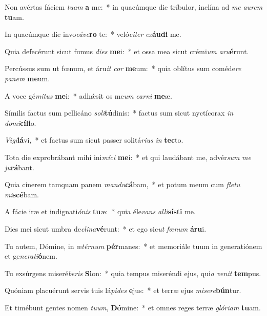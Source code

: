 \item Non avértas fáciem \textit{tu}\textit{am} \textbf{a} me:~* in quacúmque die tríbulor, inclína ad \textit{me} \textit{au}\textit{rem} \textbf{tu}am.
\item In quacúmque die invo\textit{cá}\textit{ve}\textbf{ro} te:~* veló\textit{ci}\textit{ter} \textit{ex}\textbf{áu}\textbf{di} me.
\item Quia defecérunt sicut fumus \textit{di}\textit{es} \textbf{me}i:~* et ossa mea sicut crémi\textit{um} \textit{a}\textit{ru}\textbf{é}runt.
\item Percússus sum ut fœnum, et áru\textit{it} \textit{cor} \textbf{me}um:~* quia oblítus sum coméde\textit{re} \textit{pa}\textit{nem} \textbf{me}um.
\item A voce gé\textit{mi}\textit{tus} \textbf{me}i:~* adhǽsit os me\textit{um} \textit{car}\textit{ni} \textbf{me}æ.
\item Símilis factus sum pellicáno \textit{so}\textit{li}\textbf{tú}dinis:~* factus sum sicut nyctícorax \textit{in} \textit{do}\textit{mi}\textbf{cí}\textbf{li}o.
\item \textit{Vi}\textit{gi}\textbf{lá}vi,~* et factus sum sicut passer solitá\textit{ri}\textit{us} \textit{in} \textbf{tec}to.
\item Tota die exprobrábant mihi ini\textit{mí}\textit{ci} \textbf{me}i:~* et qui laudábant me, advér\textit{sum} \textit{me} \textit{ju}\textbf{rá}bant.
\item Quia cínerem tamquam panem \textit{man}\textit{du}\textbf{cá}bam,~* et potum meum cum \textit{fle}\textit{tu} \textit{mi}\textbf{scé}bam.
\item A fácie iræ et indignati\textit{ó}\textit{nis} \textbf{tu}æ:~* quia éle\textit{vans} \textit{al}\textit{li}\textbf{sís}\textbf{ti} me.
\item Dies mei sicut umbra de\textit{cli}\textit{na}\textbf{vé}runt:~* et ego sic\textit{ut} \textit{fœ}\textit{num} \textbf{á}\textbf{ru}i.
\item Tu autem, Dómine, in æ\textit{tér}\textit{num} \textbf{pér}manes:~* et memoriále tuum in generatiónem et ge\textit{ne}\textit{ra}\textit{ti}\textbf{ó}nem.
\item Tu exsúrgens miseré\textit{be}\textit{ris} \textbf{Si}on:~* quia tempus miseréndi ejus, qui\textit{a} \textit{ve}\textit{nit} \textbf{tem}pus.
\item Quóniam placuérunt servis tuis lá\textit{pi}\textit{des} \textbf{e}jus:~* et terræ ejus \textit{mi}\textit{se}\textit{re}\textbf{bún}tur.
\item Et timébunt gentes nomen \textit{tu}\textit{um}, \textbf{Dó}mine:~* et omnes reges terræ \textit{gló}\textit{ri}\textit{am} \textbf{tu}am.
